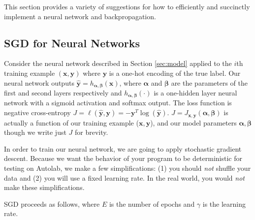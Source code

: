 \documentclass[11pt]{exam}
\numberwithin{equation}{section} %
\numberwithin{figure}{section} %
\numberwithin{table}{section} %
\newcommand{\xv}{\mathbf{x}}
\newcommand{\yv}{\mathbf{y}}
\newcommand{\alphav     }{\boldsymbol \alpha     }
\newcommand{\betav      }{\boldsymbol \beta      }
\begin{document}
This section provides a variety of suggestions for how to efficiently and succinctly implement a neural network and backpropagation. 

\subsection{SGD for Neural Networks}
\label{sec:sgd}


Consider the neural network described in Section \ref{sec:model} applied to the $i$th training example $(\xv, \yv)$ where $\yv$ is a one-hot encoding of the true label. Our neural network outputs $\hat{\yv} = h_{\alphav, \betav}(\xv)$, where $\alphav$ and $\betav$ are the parameters of the first and second layers respectively and $h_{\alphav, \betav}(\cdot)$ is a one-hidden layer neural network with a sigmoid activation and softmax output. The loss function is negative cross-entropy $J = \ell(\hat{\yv}, \yv) = - \yv^T \log(\hat{\yv})$. $J = J_{\xv, \yv}(\alphav, \betav)$ is actually a function of our training example ($\xv, \yv$), and our model parameters $\alphav, \betav$ though we write just $J$ for brevity.

In order to train our neural network, we are going to apply stochastic gradient descent. Because we want the behavior of your program to be deterministic for testing on Autolab, we make a few simplifications: (1) you should \emph{not} shuffle your data and (2) you will use a fixed learning rate. In the real world, you would \emph{not} make these simplifications. 

SGD proceeds as follows, where $E$ is the number of epochs and $\gamma$ is the learning rate.
\end{document}
